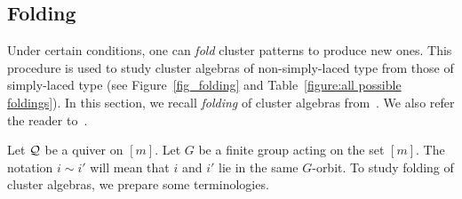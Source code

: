 \subsection{Folding}\label{sec:folding}
Under certain conditions, one can \textit{fold} cluster patterns to produce new ones. This procedure is used to study cluster algebras of non-simply-laced type from those of simply-laced type (see Figure~\ref{fig_folding} and Table~\ref{figure:all possible foldings}). In this section, we recall \textit{folding} of cluster algebras from~\cite{FWZ_chapter45}. We also refer the reader to~\cite{Dupont08}.


Let $\mathcal{Q}$ be a quiver on $[m]$.
Let $G$ be a finite group acting on the set $[m]$. 
The notation $i \sim i'$ will mean that $i$ and $i'$ lie in the same
$G$-orbit. To study folding of cluster algebras, we prepare some
terminologies.


